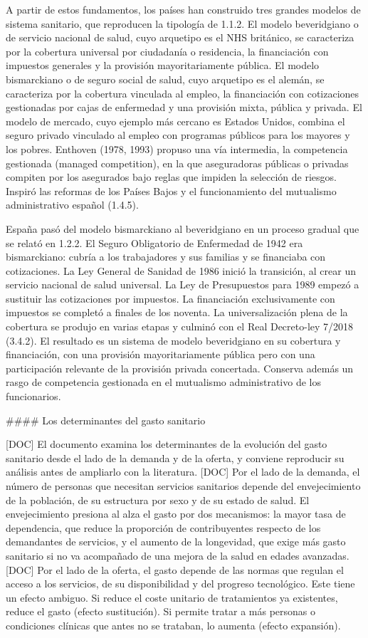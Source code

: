\documentclass[10pt,a4paper]{article}
\begin{document}
A partir de estos fundamentos, los países han construido tres grandes modelos de sistema sanitario, que reproducen la tipología de 1.1.2. El modelo beveridgiano o de servicio nacional de salud, cuyo arquetipo es el NHS británico, se caracteriza por la cobertura universal por ciudadanía o residencia, la financiación con impuestos generales y la provisión mayoritariamente pública. El modelo bismarckiano o de seguro social de salud, cuyo arquetipo es el alemán, se caracteriza por la cobertura vinculada al empleo, la financiación con cotizaciones gestionadas por cajas de enfermedad y una provisión mixta, pública y privada. El modelo de mercado, cuyo ejemplo más cercano es Estados Unidos, combina el seguro privado vinculado al empleo con programas públicos para los mayores y los pobres. Enthoven (1978, 1993) propuso una vía intermedia, la competencia gestionada (managed competition), en la que aseguradoras públicas o privadas compiten por los asegurados bajo reglas que impiden la selección de riesgos. Inspiró las reformas de los Países Bajos y el funcionamiento del mutualismo administrativo español (1.4.5).

España pasó del modelo bismarckiano al beveridgiano en un proceso gradual que se relató en 1.2.2. El Seguro Obligatorio de Enfermedad de 1942 era bismarckiano: cubría a los trabajadores y sus familias y se financiaba con cotizaciones. La Ley General de Sanidad de 1986 inició la transición, al crear un servicio nacional de salud universal. La Ley de Presupuestos para 1989 empezó a sustituir las cotizaciones por impuestos. La financiación exclusivamente con impuestos se completó a finales de los noventa. La universalización plena de la cobertura se produjo en varias etapas y culminó con el Real Decreto-ley 7/2018 (3.4.2). El resultado es un sistema de modelo beveridgiano en su cobertura y financiación, con una provisión mayoritariamente pública pero con una participación relevante de la provisión privada concertada. Conserva además un rasgo de competencia gestionada en el mutualismo administrativo de los funcionarios.

#### Los determinantes del gasto sanitario

[DOC] El documento examina los determinantes de la evolución del gasto sanitario desde el lado de la demanda y de la oferta, y conviene reproducir su análisis antes de ampliarlo con la literatura. [DOC] Por el lado de la demanda, el número de personas que necesitan servicios sanitarios depende del envejecimiento de la población, de su estructura por sexo y de su estado de salud. El envejecimiento presiona al alza el gasto por dos mecanismos: la mayor tasa de dependencia, que reduce la proporción de contribuyentes respecto de los demandantes de servicios, y el aumento de la longevidad, que exige más gasto sanitario si no va acompañado de una mejora de la salud en edades avanzadas. [DOC] Por el lado de la oferta, el gasto depende de las normas que regulan el acceso a los servicios, de su disponibilidad y del progreso tecnológico. Este tiene un efecto ambiguo. Si reduce el coste unitario de tratamientos ya existentes, reduce el gasto (efecto sustitución). Si permite tratar a más personas o condiciones clínicas que antes no se trataban, lo aumenta (efecto expansión).
\end{document}
